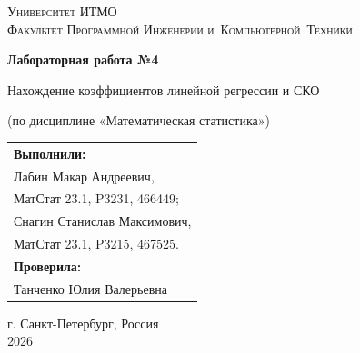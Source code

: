 \begin{titlepage}
    \begin{center}
        \large
        \textsc{Университет ИТМО\\
        Факультет Программной Инженерии и~Компьютерной~Техники}
        \vspace*{4cm}
            
        \LARGE
        \textbf{Лабораторная работа №4}

        \vspace{0.5cm}
        \LARGE

        Нахождение коэффициентов линейной регрессии и СКО
            
        \vspace{0.5cm}
        \large
        (по дисциплине «Математическая статистика»)

        \vspace{1.5cm}

        \hfill\large
        \begin{tabular}{@{}l@{}}
        \textbf{Выполнили:}\\[2mm]
        Лабин Макар Андреевич,\\
        МатСтат 23.1, P3231, 466449;\\
        Снагин Станислав Максимович,\\
        МатСтат 23.1, P3215, 467525.\\[2mm]
        \textbf{Проверила:}\\[2mm]
        Танченко Юлия Валерьевна
        \end{tabular}
            
        \vfill
            
        \vspace{0.8cm}
            
            
        \Large
        г. Санкт-Петербург, Россия\\
        2026
            
    \end{center}
\end{titlepage}

\renewcommand{\thefootnote}{[\arabic{footnote}]}